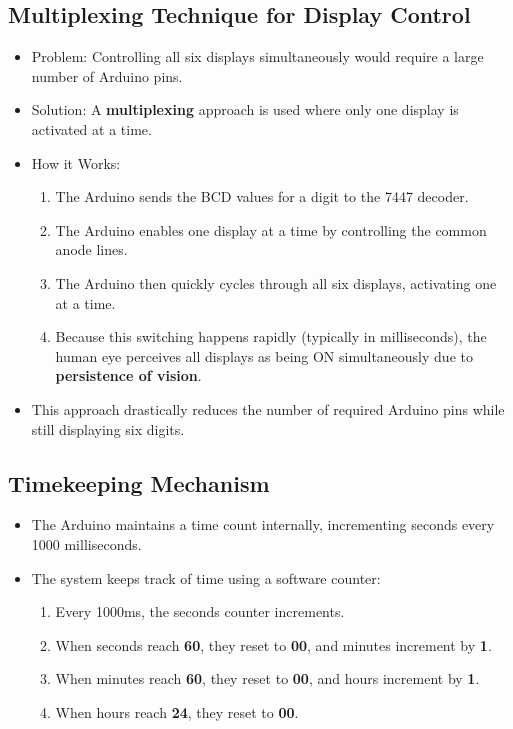 \documentclass[journal]{IEEEtran}
\begin{document}
\subsection{Multiplexing Technique for Display Control}

\begin{itemize}
    \item Problem: Controlling all six displays simultaneously would require a large number of Arduino pins.
    \item Solution: A \textbf{multiplexing} approach is used where only one display is activated at a time.
    \item How it Works:
    \begin{enumerate}
        \item The Arduino sends the BCD values for a digit to the 7447 decoder.
        \item The Arduino enables one display at a time by controlling the common anode lines.
        \item The Arduino then quickly cycles through all six displays, activating one at a time.
        \item Because this switching happens rapidly (typically in milliseconds), the human eye perceives all displays as being ON simultaneously due to \textbf{persistence of vision}.
    \end{enumerate}
    \item This approach drastically reduces the number of required Arduino pins while still displaying six digits.
\end{itemize}

\subsection{Timekeeping Mechanism}

\begin{itemize}
    \item The Arduino maintains a time count internally, incrementing seconds every 1000 milliseconds.
    \item The system keeps track of time using a software counter:
    \begin{enumerate}
        \item Every 1000ms, the seconds counter increments.
        \item When seconds reach \textbf{60}, they reset to \textbf{00}, and minutes increment by \textbf{1}.
        \item When minutes reach \textbf{60}, they reset to \textbf{00}, and hours increment by \textbf{1}.
        \item When hours reach \textbf{24}, they reset to \textbf{00}.
    \end{enumerate}
\end{itemize}
\end{document}
